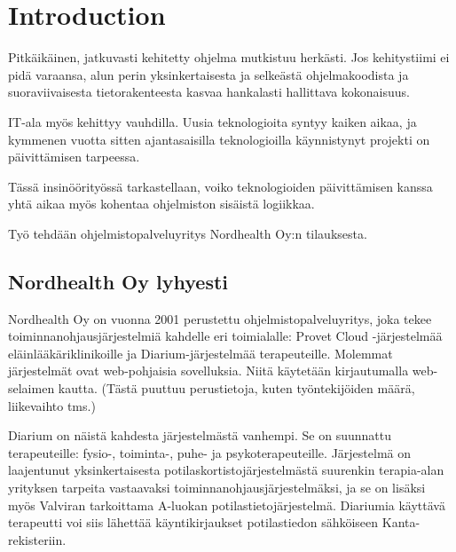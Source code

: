 
\chapter{Introduction}

Pitkäikäinen, jatkuvasti kehitetty ohjelma mutkistuu herkästi. Jos kehitystiimi
ei pidä varaansa, alun perin yksinkertaisesta ja selkeästä ohjelmakoodista ja suoraviivaisesta tietorakenteesta kasvaa hankalasti hallittava kokonaisuus.

IT-ala myös kehittyy vauhdilla. Uusia teknologioita syntyy kaiken aikaa, ja kymmenen vuotta sitten ajantasaisilla teknologioilla käynnistynyt projekti on päivittämisen tarpeessa.

Tässä insinöörityössä tarkastellaan, voiko teknologioiden päivittämisen kanssa yhtä aikaa myös kohentaa ohjelmiston sisäistä logiikkaa.

Työ tehdään ohjelmistopalveluyritys Nordhealth Oy:n tilauksesta.
 
\section{Nordhealth Oy lyhyesti}


Nordhealth Oy on vuonna 2001 perustettu ohjelmistopalveluyritys, joka tekee toiminnanohjausjärjestelmiä kahdelle eri toimialalle: Provet Cloud -järjestelmää eläinlääkäriklinikoille ja Diarium-järjestelmää terapeuteille. Molemmat järjestelmät ovat web-pohjaisia sovelluksia. Niitä käytetään kirjautumalla web-selaimen kautta. (Tästä puuttuu perustietoja, kuten työntekijöiden määrä, liikevaihto tms.)

Diarium on näistä kahdesta järjestelmästä vanhempi. Se on suunnattu terapeuteille: fysio-, toiminta-, puhe- ja psykoterapeuteille. Järjestelmä on laajentunut yksinkertaisesta potilaskortistojärjestelmästä suurenkin terapia-alan yrityksen tarpeita vastaavaksi toiminnanohjausjärjestelmäksi, ja se on lisäksi myös Valviran tarkoittama A-luokan potilastietojärjestelmä. Diariumia käyttävä terapeutti voi siis lähettää käyntikirjaukset potilastiedon sähköiseen Kanta-rekisteriin.
